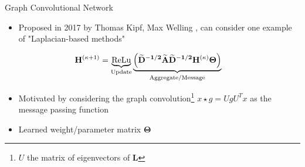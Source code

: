 \documentclass{beamer}
\newcommand{\node}{v}
\newcommand{\nrepresent}{h}
\newcommand{\NodeRepMat}{\mathbf{H}}
\newcommand{\edge}{e}
\newcommand{\DegMat}{\mathbf{D}}
\newcommand{\iter}{\kappa}
\newcommand{\AdjMat}{\mathbf{A}}
\newcommand{\LapMat}{\mathbf{L}}
\newcommand{\ReLu}{\text{ReLu}}
\begin{document}
\begin{frame}{Graph Convolutional Network}
    \begin{itemize}
    \item Proposed in 2017 by Thomas Kipf, Max Welling \cite{kipf_semi-supervised_2017}, can consider one example of "Laplacian-based methods" \cite{gilmer_neural_2017} 
    \end{itemize}
    
    \begin{align*}
        \iffalse
            \mathbf{\nrepresent}_\node^{(\iter+1)} 
            &=
            \text{Update}
            \left( 
            x_\node^{(\iter)}
            ,   
            \text{Aggregate}
            (
                \nrepresent_\node^{(\iter)}, x_u^{(\iter)}, \edge_{u,\node}^{(\iter)}
            )
            \right)
        \\
        \fi 
            \NodeRepMat^{(\iter+1)} 
            &=
            \underbrace{\ReLu}_{\text{Update}}
            \underbrace{
            \left( 
                \mathbf{
                \widetilde{\DegMat}^{-1/2}
                \widetilde{\AdjMat}
                \widetilde{\DegMat}^{-1/2}  
                \NodeRepMat^{(\iter)}
                \Theta 
                }            
            \right)
            }_{\text{Aggregate/Message}}
    \end{align*}
    
    \begin{itemize}
        \item Motivated by considering the graph convolution\footnote{$U$ the matrix of eigenvectors of $\LapMat$} $x \star g = UgU^Tx$ as the message passing function 
        \item Learned weight/parameter matrix $\boldsymbol\Theta$
    \end{itemize}
    \end{frame}
\end{document}
